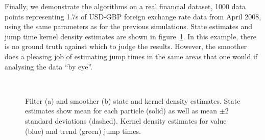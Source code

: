 \documentclass[journal]{IEEEtran}
\begin{document}
Finally, we demonstrate the algorithms on a real financial dataset, 1000 data points representing 1.7s of USD-GBP foreign exchange rate data from April 2008, using the same parameters as for the previous simulations. State estimates and jump time kernel density estimates are shown in figure~\ref{fig:fx_results}. In this example, there is no ground truth against which to judge the results. However, the smoother does a pleasing job of estimating jump times in the same areas that one would if analysing the data ``by eye''.

\begin{figure}[!t]
\centering
{} \\
\caption{Filter (a) and smoother (b) state and kernel density estimates. State estimates show mean for each particle (solid) as well as mean $\pm$2 standard deviations (dashed). Kernel density estimates for value (blue) and trend (green) jump times.}
\label{fig:fx_results}
\end{figure}
\end{document}
